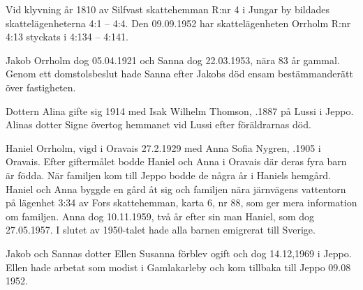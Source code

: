 Vid klyvning år 1810 av Silfvast skattehemman R:nr 4 i Jungar by bildades skattelägenheterna 4:1 – 4:4. Den 09.09.1952 har skattelägenheten Orrholm R:nr 4:13 styckats i 4:134 – 4:141.
\begin{jhchildren}
  \item {}
  \item {}
  \item {}
  \item {}
  \item {}
  \item {}
  \item {}
  \item {}
  \item {}
\end{jhchildren}
Jakob Orrholm dog 05.04.1921 och Sanna dog 22.03.1953, nära 83 år gammal. Genom ett domstolsbeslut hade Sanna efter Jakobs död ensam bestämmanderätt över fastigheten.

Dottern Alina gifte sig 1914 med Isak Wilhelm Thomson, .1887 på Lussi i Jeppo. Alinas dotter Signe övertog hemmanet vid Lussi efter föräldrarnas död.

Haniel Orrholm, vigd i Oravais 27.2.1929 med Anna Sofia Nygren, .1905 i Oravais. Efter giftermålet bodde Haniel och Anna i Oravais där deras fyra barn är födda. När familjen kom till Jeppo bodde de några år i Haniels hemgård. Haniel och Anna byggde en gård åt sig och familjen nära järnvägens vattentorn på lägenhet 3:34 av Fors skattehemman, karta 6, nr 88, som ger mera information om familjen. Anna dog 10.11.1959, två år efter sin man Haniel, som dog 27.05.1957.  I slutet av 1950-talet hade alla barnen emigrerat till Sverige.

Jakob och Sannas dotter Ellen Susanna förblev ogift och dog 14.12,1969 i Jeppo. Ellen hade arbetat som modist i Gamlakarleby och kom tillbaka till Jeppo 09.08 1952.

